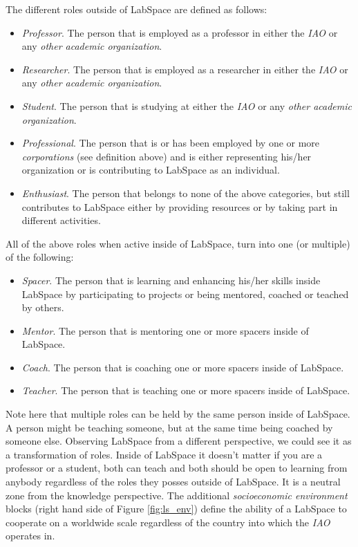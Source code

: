 \documentclass[a4paper, 11pt]{article}
\begin{document}
The different roles outside of LabSpace are defined as follows:

\begin{itemize}[noitemsep]
    \item \textit{Professor}. The person that is employed as a professor in either the \textit{IAO} or any \textit{other academic organization}.
    \item \textit{Researcher}. The person that is employed as a researcher in either the \textit{IAO} or any \textit{other academic organization}.
    \item \textit{Student}. The person that is studying at either the \textit{IAO} or any \textit{other academic organization}.
    \item \textit{Professional}. The person that is or has been employed by one or more \textit{corporations} (see definition above) and is either representing his/her organization or is contributing to LabSpace as an individual.
    \item \textit{Enthusiast}. The person that belongs to none of the above categories, but still contributes to LabSpace either by providing resources or by taking part in different activities.
\end{itemize}

All of the above roles when active inside of LabSpace, turn into one (or multiple) of the following:

\begin{itemize}[noitemsep]
    \item \textit{Spacer}. The person that is learning and enhancing his/her skills inside LabSpace by participating to projects or being mentored, coached or teached by others.
    \item \textit{Mentor}. The person that is mentoring one or more spacers inside of LabSpace.
    \item \textit{Coach}. The person that is coaching one or more spacers inside of LabSpace.
    \item \textit{Teacher}. The person that is teaching one or more spacers inside of LabSpace.
\end{itemize}

Note here that multiple roles can be held by the same person inside of LabSpace. A person might be teaching someone, but at the same time being coached by someone else. Observing LabSpace from a different perspective, we could see it as a transformation of roles. Inside of LabSpace it doesn't matter if you are a professor or a student, both can teach and both should be open to learning from anybody regardless of the roles they posses outside of LabSpace. It is a neutral zone from the knowledge perspective. The additional \textit{socioeconomic environment} blocks (right hand side of Figure \ref{fig:ls_env}) define the ability of a LabSpace to cooperate on a worldwide scale regardless of the country into which the \textit{IAO} operates in.
\end{document}
